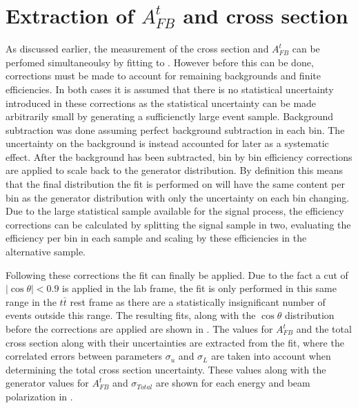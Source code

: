 \section{Extraction of $A_{FB}^t$ and cross section}
As discussed earlier, the measurement of the cross section and $A_{FB}^t$ can be perfomed simultaneoulsy by fitting to . However before this can be done, corrections must be made to account for remaining backgrounds and finite efficiencies. In both cases it is assumed that there is no statistical uncertainty introduced in these corrections as the statistical uncertainty can be made arbitrarily small by generating a sufficienctly large event sample. Background subtraction was done assuming perfect background subtraction in each bin. The uncertainty on the background is instead accounted for later as a systematic effect. After the background has been subtracted, bin by bin efficiency corrections are applied to scale back to the generator distribution. By definition this means that the final distribution the fit is performed on will have the same content per bin as the generator distribution with only the uncertainty on each bin changing. Due to the large statistical sample available for the signal process, the efficiency corrections can be calculated by splitting the signal sample in two, evaluating the efficiency per bin in each sample and scaling by these efficiencies in the alternative sample.

Following these corrections the fit can finally be applied. Due to the fact a cut of $\mid\cos\theta\mid < 0.9$ is applied in the lab frame, the fit is only performed in this same range in the $t\bar{t}$ rest frame as there are a statistically insignificant number of events outside this range. The resulting fits, along with the $\cos\theta$ distribution before the corrections are applied are shown in . The values for $A_{FB}^t$ and the total cross section along with their uncertainties are extracted from the fit, where the correlated errors between parameters $\sigma_u$ and $\sigma_L$ are taken into account when determining the total cross section uncertainty. These values along with the generator values for $A_{FB}^t$ and $\sigma_{Total}$ are shown for each energy and beam polarization in .


